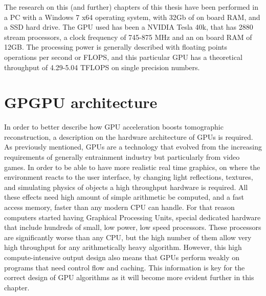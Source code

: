 The research on this (and further) chapters of this thesis have been performed in a PC with a Windows 7 x64 operating system, with 32Gb of on board RAM, and a SSD hard drive. The GPU used has been a NVIDIA Tesla 40k, that has 2880 stream processors, a clock frequency of 745-875 MHz and an on board RAM of 12GB. The processing power is generally described with floating points operations per second or FLOPS, and this particular GPU has a theoretical throughput of 4.29-5.04 TFLOPS on single precision numbers.

\section{GPGPU architecture}

In order to better describe how GPU acceleration boosts tomographic reconstruction, a description on the hardware architecture of GPUs is required. As previously mentioned, GPUs are a technology that evolved from the increasing requirements of generally entrainment industry but particularly  from video games. In order to be able to have more realistic real time graphics, on where the environment reacts to the user interface, by changing light reflections, textures, and simulating physics of objects a high throughput hardware is required. All these effects need high amount of simple arithmetic be computed, and a fast access memory, faster than any modern CPU can handle. For that reason computers started having Graphical Processing Units, special dedicated hardware that include hundreds of small, low power, low speed processors. These processors are significantly worse than any CPU, but the high number of them allow very high throughput for any arithmetically heavy algorithm. However, this high compute-intensive output design also means that GPUs perform weakly on programs that need control flow and caching. This information is key for the correct design of GPU algorithms as it will become more evident further in this chapter.

